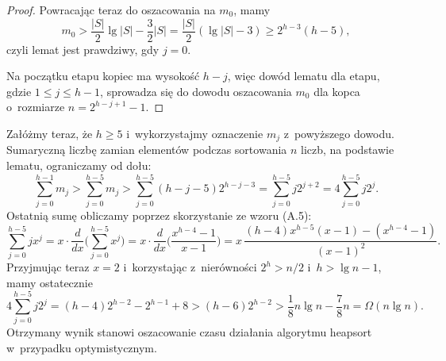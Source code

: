\begin{proof}
Powracając teraz do oszacowania na $m_0$, mamy
\[
    m_0 > \frac{|S|}{2}\lg|S|-\frac{3}{2}|S| = \frac{|S|}{2}(\lg|S|-3) \ge 2^{h-3}(h-5),
\]
czyli lemat jest prawdziwy, gdy $j=0$.

Na początku  etapu kopiec ma wysokość $h-j$, więc dowód lematu dla  etapu, gdzie $1\le j\le h-1$, sprowadza się do dowodu oszacowania $m_0$ dla kopca o~rozmiarze $n=2^{h-j+1}-1$.
\end{proof}

Załóżmy teraz, że $h\ge5$ i~wykorzystajmy oznaczenie $m_j$ z~powyższego dowodu.
Sumaryczną liczbę zamian elementów podczas sortowania $n$ liczb, na podstawie lematu, ograniczamy od dołu:
\[
    \sum_{j=0}^{h-1}m_j > \sum_{j=0}^{h-5}m_j > \sum_{j=0}^{h-5}(h-j-5)2^{h-j-3} = \sum_{j=0}^{h-5}j2^{j+2} = 4\sum_{j=0}^{h-5}j2^j.
\]
Ostatnią sumę obliczamy poprzez skorzystanie ze wzoru (A.5):
\[
    \sum_{j=0}^{h-5}jx^j = x\cdot\frac{d}{dx}\biggl(\sum_{j=0}^{h-5}x^j\biggr) = x\cdot\frac{d}{dx}\biggl(\frac{x^{h-4}-1}{x-1}\biggr) = x\,\frac{(h-4)x^{h-5}(x-1)-(x^{h-4}-1)}{(x-1)^2}.
\]
Przyjmując teraz $x=2$ i~korzystając z~nierówności $2^h>n/2$ i~$h>\lg n-1$, mamy ostatecznie
\[
    4\sum_{j=0}^{h-5}j2^j = (h-4)2^{h-2}-2^{h-1}+8 > (h-6)2^{h-2} > \frac{1}{8}n\lg n-\frac{7}{8}n = \Omega(n\lg n).
\]
Otrzymany wynik stanowi oszacowanie czasu działania algorytmu heapsort w~przypadku optymistycznym.
